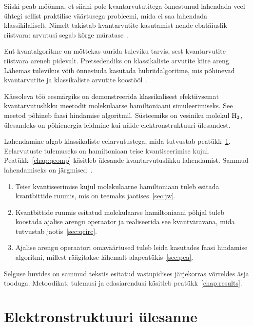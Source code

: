 \documentclass[12pt]{report}
\begin{document}
Siiski peab möönma, et siiani pole kvantarvututitega õnnestunud lahendada veel ühtegi sellist praktilise väärtusega probleemi, mida ei saa lahendada klassikilaliselt.
Nimelt takistab kvantarvutite kasutamist nende ebatäiuslik riistvara: arvutusi segab kõrge müratase~\cite{whitfield+etal2022}.

Ent kvantalgoritme on mõttekas uurida tuleviku tarvis, sest kvantarvutite riistvara areneb pidevalt.
Pretsedendiks on klassikaliste arvutite kiire areng.
Lähemas tulevikus võib õnnestuda kasutada hübriidalgoritme, mis põhinevad kvantarvutite ja klassikaliste arvutite koostööl~\cite{omalley+etal}.

Käesoleva töö eesmärgiks on demonstreerida klassikalisest efektiivsemat kvantarvutuslikku meetodit molekulaarse hamiltoniaani simuleerimiseks.
See meetod põhineb faasi hindamise algoritmil.
Süsteemiks on vesiniku molekul \(\rm H_2\), ülesandeks on põhienergia leidmine kui näide elektronstruktuuri ülesandest.

Lahendamine algab klassikaliste eelarvutustega, mida tutvustab peatükk~\ref{chap:qchem}.
Eelarvutuste tulemuseks on hamiltoniaan teise kvantiseerimise kujul.
Peatükk~\ref{chap:qcomp} käsitleb ülesande kvantarvutuslikku lahendamist.
Sammud lahendamiseks on järgmised~\cite{whitfield+etal2011}.

\begin{enumerate}
    \item Teise kvantiseerimise kujul molekulaarne hamiltoniaan tuleb esitada kvantbittide ruumis, mis on teemaks jaotises~\ref{sec:jw}.
    \item Kvantbittide ruumis esitatud molekulaarse hamiltoniaani põhjal tuleb koostada ajalise arengu operaator ja realiseerida see kvantväravana, mida tutvustab jaotis~\ref{sec:qcirc}.
    \item Ajalise arengu operaatori omaväärtused tuleb leida kasutades faasi hindamise algoritmi, millest räägitakse lähemalt alapeatükis~\ref{sec:pea}.
\end{enumerate}
Selguse huvides on sammud tekstis esitatud vastupidises järjekorras võrreldes äsja tooduga.
Metoodikat, tulemusi ja edasiarendusi käsitleb peatükk~\ref{chap:results}.

\chapter{Elektronstruktuuri ülesanne}\label{chap:qchem}
\end{document}

